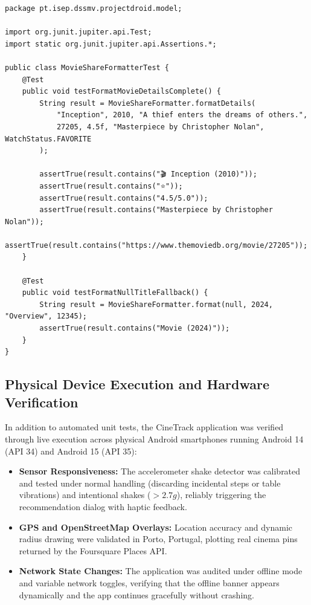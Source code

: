 \documentclass[runningheads,a4paper]{llncs}
\begin{document}
\begin{lstlisting}[style=javastyle,caption={JUnit 5 Social Share Formatter Tests (MovieShareFormatterTest.java)},label={lst:share-test}]
package pt.isep.dssmv.projectdroid.model;

import org.junit.jupiter.api.Test;
import static org.junit.jupiter.api.Assertions.*;

public class MovieShareFormatterTest {
    @Test
    public void testFormatMovieDetailsComplete() {
        String result = MovieShareFormatter.formatDetails(
            "Inception", 2010, "A thief enters the dreams of others.",
            27205, 4.5f, "Masterpiece by Christopher Nolan", WatchStatus.FAVORITE
        );

        assertTrue(result.contains("🎬 Inception (2010)"));
        assertTrue(result.contains("⭐"));
        assertTrue(result.contains("4.5/5.0"));
        assertTrue(result.contains("Masterpiece by Christopher Nolan"));
        assertTrue(result.contains("https://www.themoviedb.org/movie/27205"));
    }

    @Test
    public void testFormatNullTitleFallback() {
        String result = MovieShareFormatter.format(null, 2024, "Overview", 12345);
        assertTrue(result.contains("Movie (2024)"));
    }
}
\end{lstlisting}

\subsection{Physical Device Execution and Hardware Verification}
In addition to automated unit tests, the CineTrack application was verified through live execution across physical Android smartphones running Android 14 (API 34) and Android 15 (API 35):
\begin{itemize}
    \item \textbf{Sensor Responsiveness:} The accelerometer shake detector was calibrated and tested under normal handling (discarding incidental steps or table vibrations) and intentional shakes ($>2.7g$), reliably triggering the recommendation dialog with haptic feedback.
    \item \textbf{GPS and OpenStreetMap Overlays:} Location accuracy and dynamic radius drawing were validated in Porto, Portugal, plotting real cinema pins returned by the Foursquare Places API.
    \item \textbf{Network State Changes:} The application was audited under offline mode and variable network toggles, verifying that the offline banner appears dynamically and the app continues gracefully without crashing.
\end{itemize}
\end{document}

